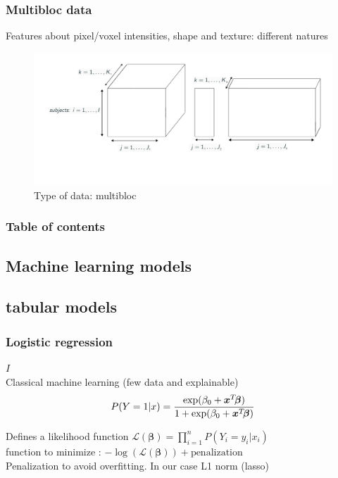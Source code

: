 \documentclass{beamer}
\begin{document}
\begin{frame}
    \frametitle{Multibloc data}
    Features about pixel/voxel intensities, shape and texture: different natures
    \begin{figure}
        \centering
        \includegraphics[scale = 0.35]{images/blocks.png}
        \caption{Type of data: multibloc}
    \end{figure}
\end{frame}



\begin{frame}
    \frametitle{Table of contents}
    \tableofcontents
\end{frame}

\begin{frame}
    \section{Machine learning models}
    \subsection{tabular models}
\end{frame}

\begin{frame}
    \frametitle{Logistic regression}
    $I$\\[10 pt]
    Classical machine learning (few data and explainable)\\[10 pt]

    $$P(Y = 1|x) = \frac{\exp(\beta_0 + \bm{x}^T\hspace{-2 pt}\bm{\beta})}{1 + \exp(\beta_0 + \bm{x}^T\hspace{-2 pt}\bm{\beta})}$$

    Defines a likelihood function $\mathcal{L}(\bm{\beta}) = \prod_{i = 1}^n P(Y_i = y_i|x_i)$\\[15 pt]

    function to minimize : $- \log(\mathcal{L}(\bm{\beta})) + \text{penalization}$ \\[15 pt]

    Penalization to avoid overfitting. In our case L1 norm (lasso)
\end{frame}
\end{document}
